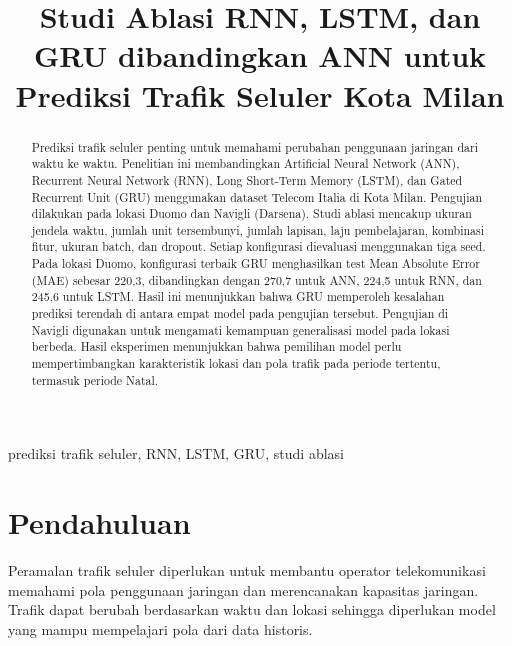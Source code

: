 \documentclass[conference,a4paper]{IEEEtran}
\begin{document}
\title{Studi Ablasi RNN, LSTM, dan GRU dibandingkan ANN untuk Prediksi Trafik Seluler Kota Milan}

\author{
}

\maketitle

\begin{abstract}
Prediksi trafik seluler penting untuk memahami perubahan penggunaan jaringan dari waktu ke waktu. Penelitian ini membandingkan Artificial Neural Network (ANN), Recurrent Neural Network (RNN), Long Short-Term Memory (LSTM), dan Gated Recurrent Unit (GRU) menggunakan dataset Telecom Italia di Kota Milan. Pengujian dilakukan pada lokasi Duomo dan Navigli (Darsena). Studi ablasi mencakup ukuran jendela waktu, jumlah unit tersembunyi, jumlah lapisan, laju pembelajaran, kombinasi fitur, ukuran batch, dan dropout. Setiap konfigurasi dievaluasi menggunakan tiga seed. Pada lokasi Duomo, konfigurasi terbaik GRU menghasilkan test Mean Absolute Error (MAE) sebesar 220,3, dibandingkan dengan 270,7 untuk ANN, 224,5 untuk RNN, dan 245,6 untuk LSTM. Hasil ini menunjukkan bahwa GRU memperoleh kesalahan prediksi terendah di antara empat model pada pengujian tersebut. Pengujian di Navigli digunakan untuk mengamati kemampuan generalisasi model pada lokasi berbeda. Hasil eksperimen menunjukkan bahwa pemilihan model perlu mempertimbangkan karakteristik lokasi dan pola trafik pada periode tertentu, termasuk periode Natal.
\end{abstract}

\begin{IEEEkeywords}
prediksi trafik seluler, RNN, LSTM, GRU, studi ablasi
\end{IEEEkeywords}

\section{Pendahuluan}

Peramalan trafik seluler diperlukan untuk membantu operator telekomunikasi memahami pola penggunaan jaringan dan merencanakan kapasitas jaringan. Trafik dapat berubah berdasarkan waktu dan lokasi sehingga diperlukan model yang mampu mempelajari pola dari data historis.
\end{document}
